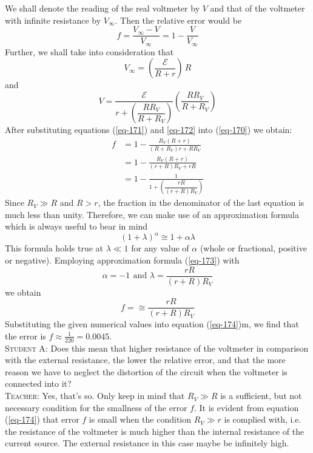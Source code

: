 \documentclass[a4paper,sfsidenotes]{tufte-book}
\newcommand{\Ea}{\mathcal{E}}
\begin{document}
We shall denote the reading of the real voltmeter by $V$ and that of the voltmeter with infinite resistance by $V_{\infty}$. Then the relative error would be
\begin{equation}
f  = \frac{V_{\infty} - V}{V_{\infty}} = 1 - \frac{V}{V_{\infty}} 
\label{eq-170}
\end{equation}
Further, we shall take into consideration that
\begin{equation}
V_{\infty} = \left( \frac{\Ea}{R+r} \right) \,R 
\label{eq-171}
\end{equation}
and 
\begin{equation}
V = \frac{\Ea}{r + \left( \dfrac{RR_{V}}{R + R_{V}} \right)} \left( \frac{RR_{V}}{R+R_{V}} \right)
\label{eq-172}
\end{equation}
After substituting equations (\ref{eq-171}) and \ref{eq-172} into (\ref{eq-170}) we obtain:
\begin{align*}
f & = 1 - \frac{R_{V} (R + r)}{(R + R_{V})r + RR_{V}} \\
& = 1 - \frac{R_{V} (R + r)}{(r+R)R_{V} + rR} \\
&= 1 - \frac{1}{1+ \left( \dfrac{rR}{(r+R)R_{V}} \right)} 
\end{align*}
Since $R_{V}\gg R$ and $R> r$, the fraction in the denominator of the last equation is much less than unity. Therefore, we can make use of an approximation formula which is always useful to bear in mind
\begin{equation}
(1+\lambda)^{\alpha} \cong 1 + \alpha \lambda 
\label{eq-173}
\end{equation}
This formula holds true at $\lambda \ll 1$ for any value of $\alpha$ (whole or fractional, positive or negative). Employing approximation formula (\ref{eq-173}) with
\begin{equation*}
\alpha = -1 \,\ \text{and} \,\, \lambda = \frac{rR}{(r+R)R_{V}}
\end{equation*}
we obtain
\begin{equation}
f = \cong \frac{rR}{(r+R)R_{V}}
\label{eq-174}
\end{equation}
Substituting the given numerical values into equation (\ref{eq-174})m, we find that the error is $f \approx \frac{1}{220} = 0.0045$.
\\
\textsc{Student A:} Does this mean that higher resistance of the voltmeter in comparison with the external resistance, the lower the relative error, and that the more reason we have to neglect the distortion of the circuit when the voltmeter is connected into it?
\\
\textsc{Teacher:} Yes, that's so. Only keep in mind that  $R_{V} \gg R$ is a sufficient, but not necessary condition for the smallness of the error $f$. It is evident from equation (\ref{eq-174}) that error $f$ is small when the condition  $R_{V}\gg r$ is complied with, i.e. the resistance of the voltmeter is much higher than the internal resistance of the current source. The external resistance in this case maybe be infinitely high. 
\end{document}
